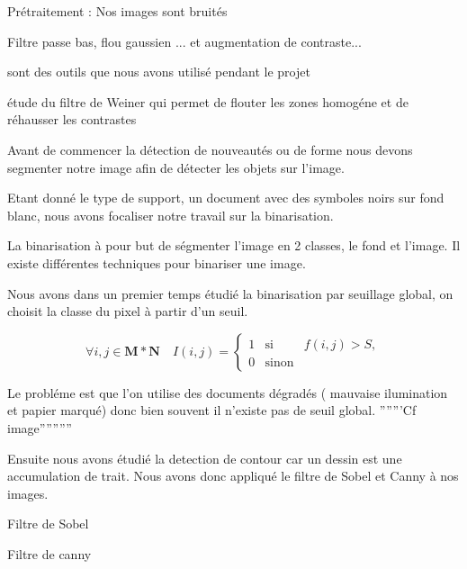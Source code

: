 Prétraitement : 
Nos images sont bruités  


Filtre passe bas, flou gaussien ...   
et 
augmentation de contraste...

sont des outils que nous avons utilisé pendant le projet   


étude du filtre de Weiner qui permet de flouter les zones homogéne et de réhausser les contrastes 


Avant de commencer la détection de nouveautés ou de forme nous devons segmenter notre image afin de détecter les objets sur l'image.

Etant donné le type de support, un document avec des symboles noirs sur fond blanc, nous avons focaliser notre travail sur la binarisation.

La binarisation à pour but de ségmenter l'image en 2 classes, le fond et l'image.
Il existe différentes techniques pour binariser une image.

Nous avons dans un premier temps étudié la binarisation par seuillage global, on choisit la classe du pixel à partir d'un seuil.

\begin{equation}
	\forall i,j \in \mathbf{M*N} \quad I(i,j)=
	\left\lbrace
	\begin{array}{ccc}
		1 &\mbox{si}& f(i,j) > S,\\
		0 &\mbox{sinon}&
	\end{array}\right.
\end{equation}


Le probléme est que l'on utilise des documents dégradés ( mauvaise ilumination et papier marqué) donc bien souvent il n'existe pas de seuil global.
'''''''Cf image'''''''''' 


Ensuite nous avons étudié la detection de contour car un dessin est une accumulation de trait.
Nous avons donc appliqué le filtre de Sobel et Canny à nos images.

Filtre de Sobel

Filtre de canny 



